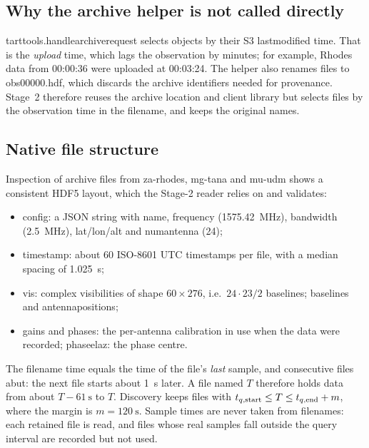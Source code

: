 \documentclass[11pt,a4paper]{article}
\newcommand{\code}[1]{{\ttfamily\def\_{\textunderscore\allowbreak}#1}}
\begin{document}
\subsection{Why the archive helper is not called directly}

\code{tart\_tools.handle\_archive\_request} selects objects by their S3
\code{last\_modified} time. That is the \emph{upload} time, which lags the
observation by minutes; for example, Rhodes data from 00:00:36 were uploaded
at 00:03:24. The helper also renames files to \code{obs\_00000.hdf}, which
discards the archive identifiers needed for provenance. Stage~2 therefore
reuses the archive location and client library but selects files by the
observation time in the filename, and keeps the original names.

\subsection{Native file structure}

Inspection of archive files from \code{za-rhodes}, \code{mg-tana} and
\code{mu-udm} shows a consistent HDF5 layout, which the Stage-2 reader
relies on and validates:
\begin{itemize}
\item \code{config}: a JSON string with \code{name}, \code{frequency}
(\SI{1575.42}{\mega\hertz}), \code{bandwidth} (\SI{2.5}{\mega\hertz}),
\code{lat}/\code{lon}/\code{alt} and \code{num\_antenna} (24);
\item \code{timestamp}: about 60 ISO-8601 UTC timestamps per file, with a
median spacing of \SI{1.025}{\second};
\item \code{vis}: complex visibilities of shape $60\times276$, i.e.\
$24\cdot23/2$ baselines; \code{baselines} and \code{antenna\_positions};
\item \code{gains} and \code{phases}: the per-antenna calibration in use
when the data were recorded; \code{phase\_elaz}: the phase centre.
\end{itemize}
The filename time equals the time of the file's \emph{last} sample, and
consecutive files abut: the next file starts about \SI{1}{\second} later.
A file named $T$ therefore holds data from about $T-\SI{61}{\second}$ to
$T$. Discovery keeps files with $t_{q,\rm start}\le T\le t_{q,\rm end}+m$,
where the margin is $m=\SI{120}{\second}$. Sample times are never taken from
filenames: each retained file is read, and files whose real samples fall
outside the query interval are recorded but not used.
\end{document}
